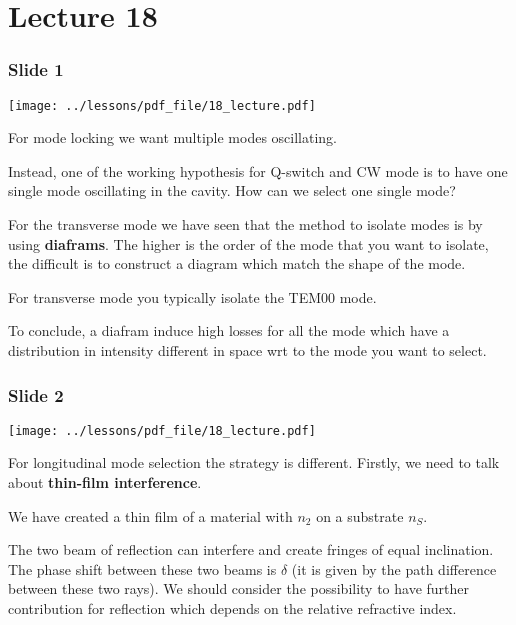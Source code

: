 \documentclass[../main/main.tex]{subfiles}
\begin{document}
\pagestyle{plain}

\section{Lecture 18}


\subsubsection*{Slide 1}

\begin{minipage}[]{0.5\linewidth}
\centering
\texttt{[image: ../lessons/pdf\_file/18\_lecture.pdf]}
\end{minipage}
\hspace{0.3cm}\vspace{0.3cm}
\begin{minipage}[c]{0.47\linewidth}

For mode locking we want multiple modes oscillating.

Instead, one of the working hypothesis for Q-switch and CW mode is to have one single mode oscillating in the cavity. How can we select one single mode?

For the transverse mode we have seen that the method to isolate modes is by using \textbf{diaframs}. The higher is the order of the mode that you want to isolate, the difficult is to construct a diagram which match the shape of the mode.

For transverse mode you typically isolate the TEM00 mode.

To conclude, a diafram induce high losses for all the mode which have a distribution in intensity different in space wrt to the mode you want to select.

\end{minipage}

\subsubsection*{Slide 2}

\begin{minipage}[]{0.5\linewidth}
\centering
\texttt{[image: ../lessons/pdf\_file/18\_lecture.pdf]}
\end{minipage}
\hspace{0.3cm}\vspace{0.3cm}
\begin{minipage}[c]{0.47\linewidth}

For longitudinal mode selection the strategy is different.
Firstly, we need to talk about \textbf{thin-film interference}.

We have created a thin film of a material with \( n_2 \) on a substrate \( n_S \).

The two beam of reflection can interfere and create fringes of equal inclination. The phase shift between these two beams is \( \delta  \) (it is given by the path difference between these two rays). We should consider the possibility to have further contribution for reflection which depends on the relative refractive index.

\end{minipage}
\end{document}
